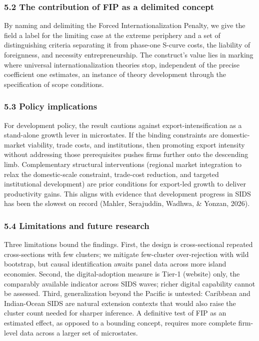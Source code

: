 \documentclass[
  12pt,a4paper]{article}
\begin{document}
\hypertarget{the-contribution-of-fip-as-a-delimited-concept}{%
\subsubsection{5.2 The contribution of FIP as a delimited
concept}\label{the-contribution-of-fip-as-a-delimited-concept}}

By naming and delimiting the Forced Internationalization Penalty, we
give the field a label for the limiting case at the extreme periphery
and a set of distinguishing criteria separating it from phase-one
S-curve costs, the liability of foreignness, and necessity
entrepreneurship. The construct's value lies in marking where universal
internationalization theories stop, independent of the precise
coefficient one estimates, an instance of theory development through
the specification of scope conditions.

\hypertarget{policy-implications}{%
\subsubsection{5.3 Policy implications}\label{policy-implications}}

For development policy, the result cautions against
export-intensification as a stand-alone growth lever in microstates. If
the binding constraints are domestic-market viability, trade costs, and
institutions, then promoting export intensity without addressing those
prerequisites pushes firms further onto the descending limb.
Complementary structural interventions (regional market integration to
relax the domestic-scale constraint, trade-cost reduction, and targeted
institutional development) are prior conditions for export-led growth
to deliver productivity gains. This aligns with evidence that
development progress in SIDS has been the slowest on record (Mahler,
Serajuddin, Wadhwa, \& Yonzan, 2026).

\hypertarget{limitations-and-future-research}{%
\subsubsection{5.4 Limitations and future
research}\label{limitations-and-future-research}}

Three limitations bound the findings. First, the design is
cross-sectional repeated cross-sections with few clusters; we mitigate
few-cluster over-rejection with wild bootstrap, but causal
identification awaits panel data across more island economies. Second,
the digital-adoption measure is Tier-1 (website) only, the comparably
available indicator across SIDS waves; richer digital capability cannot
be assessed. Third, generalization beyond the Pacific is
untested: Caribbean and Indian-Ocean SIDS are natural extension
contexts that would also raise the cluster count needed for sharper
inference. A definitive test of FIP as an estimated effect, as opposed
to a bounding concept, requires more complete firm-level data across a
larger set of microstates.
\end{document}
